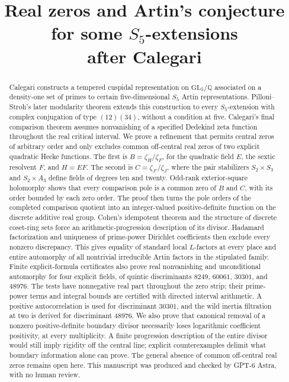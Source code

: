 \documentclass[11pt]{article}
\title{Real zeros and Artin's conjecture for some\texorpdfstring{ $S_5$}{ S5}-extensions\\[3pt]\large after Calegari}
\author{}
\date{}
\theoremstyle{definition}
\theoremstyle{remark}
\newcommand{\Q}{\mathbb Q}
\newcommand{\GL}{\mathrm{GL}}
\numberwithin{equation}{section}
\begin{document}
\maketitle
\begin{abstract}
Calegari constructs a tempered cuspidal representation on $\GL_5/\Q$ associated on a density-one set of primes to certain five-dimensional $S_5$ Artin representations. Pilloni--Stroh's later modularity theorem extends this construction to every $S_5$-extension with complex conjugation of type $(12)(34)$, without a condition at five. Calegari's final comparison theorem assumes nonvanishing of a specified Dedekind zeta function throughout the real critical interval. We prove a refinement that permits central zeros of arbitrary order and only excludes common off-central real zeros of two explicit quadratic Hecke functions. The first is $B=\zeta_H/\zeta_F$, for the quadratic field $E$, the sextic resolvent $F$, and $H=EF$. The second is $C=\zeta_{J'}/\zeta_J$, where the pair stabilizers $S_2\times S_3$ and $S_2\times A_3$ define fields of degrees ten and twenty. Odd-rank exterior-square holomorphy shows that every comparison pole is a common zero of $B$ and $C$, with its order bounded by each zero order. The proof then turns the pole orders of the completed comparison quotient into an integer-valued positive-definite function on the discrete additive real group. Cohen's idempotent theorem and the structure of discrete coset-ring sets force an arithmetic-progression description of its divisor. Hadamard factorization and uniqueness of prime-power Dirichlet coefficients then exclude every nonzero discrepancy. This gives equality of standard local $L$-factors at every place and entire automorphy of all nontrivial irreducible Artin factors in the stipulated family. Finite explicit-formula certificates also prove real nonvanishing and unconditional automorphy for four explicit fields, of quintic discriminants $8249$, $60061$, $30301$, and $48976$. The tests have nonnegative real part throughout the zero strip; their prime-power terms and integral bounds are certified with directed interval arithmetic. A positive autocorrelation is used for discriminant $30301$, and the wild inertia filtration at two is derived for discriminant $48976$. We also prove that canonical removal of a nonzero positive-definite boundary divisor necessarily loses logarithmic coefficient positivity, at every multiplicity. A finite progression description of the entire divisor would still imply rigidity off the central line; explicit counterexamples delimit what boundary information alone can prove. The general absence of common off-central real zeros remains open here. This manuscript was produced and checked by GPT-6 Astra, with no human review.
\end{abstract}
\end{document}

